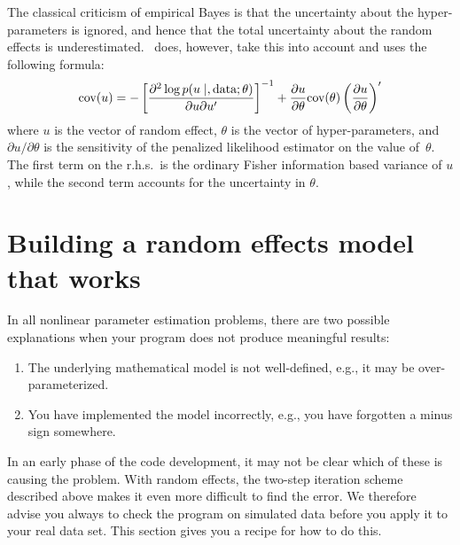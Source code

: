 \documentclass{admbmanual}
\begin{document}
The classical criticism of empirical Bayes is that the uncertainty about the hyper-parameters is ignored,
and hence that the total uncertainty about the random effects is underestimated. \scAR\ does, however,
take this into account and uses the following formula:
\begin{equation}
\textrm{cov}(u)
  =
    -\left[\frac{\partial^{2}\log p(u \mid, \hbox{data};\theta)}
  {\partial u\partial u^{\prime}}\right]^{-1}+ \frac{
  \partial u}{\partial\theta}
  \hbox{cov}(\theta) \left(\frac{\partial u}{\partial\theta}\right)^{\prime}
  \label{eq:EB_variance}
\end{equation}
where $u$ is the vector of random effect, $\theta$ is the vector of hyper-parameters, 
and $\partial u/\partial\theta$ is the sensitivity of the penalized likelihood estimator on the
value of~$\theta$. The first term on the r.h.s.~is the ordinary Fisher information based variance
of $u$, while the second term accounts for the uncertainty in $\theta$.


\section{Building a random effects model that works}

In all nonlinear parameter estimation problems, there are two possible
explanations when your program does not produce meaningful results:
\begin{enumerate}
\item The underlying mathematical model is not well-defined, e.g., it may be
over-parameterized.
\item You have implemented the model incorrectly, e.g., you have forgotten a
minus sign somewhere.
\end{enumerate}
In an early phase of the code development, it may not be clear which of these
is causing the problem. With random effects, the two-step iteration scheme
described above makes it even more difficult to find the error. We therefore
advise you always to check the program on simulated data before you apply it to your real data set. This
section gives you a recipe for how to do this.
\end{document}

